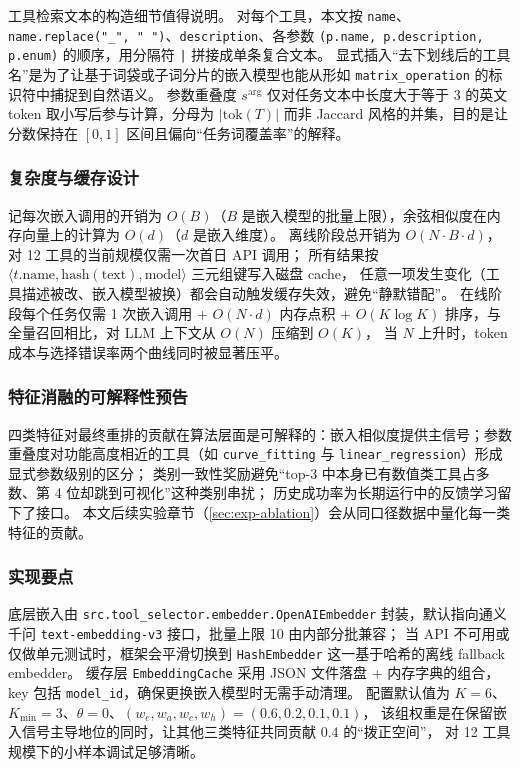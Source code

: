 工具检索文本的构造细节值得说明。
对每个工具，本文按 \texttt{name}、\texttt{name.replace("\_", " ")}、\texttt{description}、各参数 \texttt{(p.name, p.description, p.enum)} 的顺序，用分隔符 \texttt{|} 拼接成单条复合文本。
显式插入“去下划线后的工具名”是为了让基于词袋或子词分片的嵌入模型也能从形如 \texttt{matrix\_operation} 的标识符中捕捉到自然语义。
参数重叠度 $s^{\text{arg}}$ 仅对任务文本中长度大于等于 3 的英文 token 取小写后参与计算，分母为 $|\mathrm{tok}(T)|$ 而非 Jaccard 风格的并集，目的是让分数保持在 $[0,1]$ 区间且偏向“任务词覆盖率”的解释。

\subsubsection{复杂度与缓存设计}

记每次嵌入调用的开销为 $O(B)$（$B$ 是嵌入模型的批量上限），余弦相似度在内存向量上的计算为 $O(d)$（$d$ 是嵌入维度）。
离线阶段总开销为 $O(N\cdot B\cdot d)$，对 12 工具的当前规模仅需一次首日 API 调用；
所有结果按 $\langle t.\text{name},\mathrm{hash}(\mathrm{text}),\text{model}\rangle$ 三元组键写入磁盘 cache，
任意一项发生变化（工具描述被改、嵌入模型被换）都会自动触发缓存失效，避免“静默错配”。
在线阶段每个任务仅需 1 次嵌入调用 + $O(N\cdot d)$ 内存点积 + $O(K\log K)$ 排序，与全量召回相比，对 LLM 上下文从 $O(N)$ 压缩到 $O(K)$，
当 $N$ 上升时，token 成本与选择错误率两个曲线同时被显著压平。

\subsubsection{特征消融的可解释性预告}

四类特征对最终重排的贡献在算法层面是可解释的：嵌入相似度提供主信号；参数重叠度对功能高度相近的工具（如 \texttt{curve\_fitting} 与 \texttt{linear\_regression}）形成显式参数级别的区分；
类别一致性奖励避免“top-3 中本身已有数值类工具占多数、第 4 位却跳到可视化”这种类别串扰；
历史成功率为长期运行中的反馈学习留下了接口。
本文后续实验章节（\autoref{sec:exp-ablation}）会从同口径数据中量化每一类特征的贡献。

\subsubsection{实现要点}

底层嵌入由 \texttt{src.tool\_selector.embedder.OpenAIEmbedder} 封装，默认指向通义千问 \texttt{text-embedding-v3} 接口，批量上限 10 由内部分批兼容；
当 API 不可用或仅做单元测试时，框架会平滑切换到 \texttt{HashEmbedder} 这一基于哈希的离线 fallback embedder。
缓存层 \texttt{EmbeddingCache} 采用 JSON 文件落盘 + 内存字典的组合，key 包括 \texttt{model\_id}，确保更换嵌入模型时无需手动清理。
配置默认值为 $K=6$、$K_{\min}=3$、$\theta=0$、$(w_e, w_a, w_c, w_h)=(0.6, 0.2, 0.1, 0.1)$，
该组权重是在保留嵌入信号主导地位的同时，让其他三类特征共同贡献 $0.4$ 的“拨正空间”，
对 12 工具规模下的小样本调试足够清晰。

